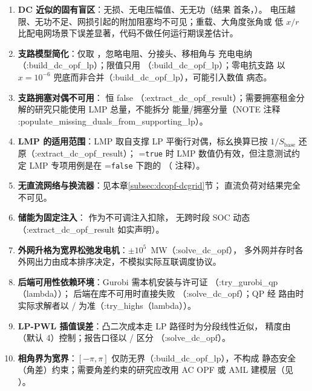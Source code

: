 \begin{enumerate}
  \item \textbf{DC 近似的固有盲区}：无损、无电压幅值、无无功（结果
         首条，）。
        电压越限、无功不足、网损引起的附加阻塞均不可见；重载、大角度张角或
        低 $x/r$ 比配电网场景下误差显著，代码不做任何运行期误差估计。
  \item \textbf{支路模型简化}：仅取 ，忽略电阻、分接头、移相角与
        充电电纳（:build\_dc\_opf\_lp）；限值只用 （:build\_dc\_opf\_lp）；零电抗支路
        以 $x=10^{-6}$ 兜底而非合并（:build\_dc\_opf\_lp），可能引入数值
        病态。
  \item \textbf{支路拥塞对偶不可用}： 恒 false
        （:extract\_dc\_opf\_result）；需要拥塞租金分解的研究只能使用 LMP 总量，不能拆分
        能量/拥塞分量（NOTE 注释 :populate\_missing\_duals\_from\_supporting\_lp）。
  \item \textbf{LMP 的适用范围}：LMP 取自支撑 LP 平衡行对偶，标幺换算已按
        $1/S_{\mathrm{base}}$ 还原（:extract\_dc\_opf\_result）；
        =\texttt{true} 时 LMP 数值仍有效，但注意测试约定 LMP 专项用例是在
        =\texttt{false} 下跑的
        （ 注释）。
  \item \textbf{无直流网络与换流器}：见本章\ref{subsec:dcopf-dcgrid}节；
        直流负荷对结果完全不可见。
  \item \textbf{储能为固定注入}： 作为不可调注入扣除，
        无跨时段 SOC 动态（:extract\_dc\_opf\_result 如实声明）。
  \item \textbf{外网升格为宽界松弛发电机}：$\pm 10^{5}$~MW（:solve\_dc\_opf），
        多外网并存时各外网出力由成本排序决定，不模拟实际互联调度协议。
  \item \textbf{后端可用性依赖环境}：Gurobi 需本机安装与许可证
        （:try\_gurobi\_qp（lambda））； 后端在库不可用时直接失败
        （:solve\_dc\_opf）；QP 经  路由时实际求解者以
        / 为准（:try\_highs（lambda））。
  \item \textbf{LP-PWL 插值误差}：凸二次成本走 LP 路径时为分段线性近似，
        精度由 （默认 4）控制；报告口径以
        / 区分
        （:solve\_dc\_opf）。
  \item \textbf{相角界为宽界}：$[-\pi,\pi]$ 仅防无界（:build\_dc\_opf\_lp），不构成
        静态安全（角差）约束；需要角差约束的研究应改用
        AC OPF 或 AML 建模层（见
        ）。
\end{enumerate}
